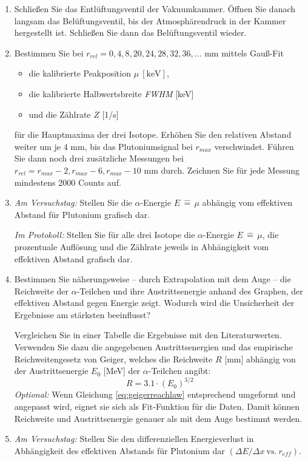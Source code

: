 \begin{enumerate}[label=\textbf{\alph*)}]
	\item Schließen Sie das Entlüftungsventil der Vakuumkammer. Öffnen Sie danach langsam das Belüftungsventil, bis der Atmosphärendruck in der Kammer hergestellt ist. Schließen Sie dann das Belüftungsventil wieder.
	\item Bestimmen Sie bei $r_{rel} = 0, 4, 8, 20, 24, 28, 32, 36, \dots$ mm mittels Gauß-Fit
	\begin{itemize}[nosep]
		\item die kalibrierte Peakposition $\mu\ [\text{keV}]$,
		\item die kalibrierte Halbwertsbreite \textit{FWHM} [keV]
		\item und die Zählrate $Z$ [1/s]
	\end{itemize}
	für die Hauptmaxima der drei Isotope. Erhöhen Sie den relativen Abstand weiter um je $4$ mm, bis das Plutoniumsignal bei $r_{max}$ verschwindet. Führen Sie dann noch drei zusätzliche Messungen bei $r_{rel} = r_{max} - 2, r_{max} - 6, r_{max} - 10$ mm durch. Zeichnen Sie für jede Messung mindestens 2000 Counts auf.
	\item \textit{Am Versuchstag:} Stellen Sie die $\alpha$-Energie $E\, \widehat{=}\, \mu$ abhängig vom effektiven Abstand für Plutonium grafisch dar.
	
	\textit{Im Protokoll:} Stellen Sie für alle drei Isotope die $\alpha$-Energie $E\, \widehat{=}\, \mu$, die prozentuale Auflösung und die Zählrate jeweils in Abhängigkeit vom effektiven Abstand grafisch dar.
	\item Bestimmen Sie näherungsweise -- durch Extrapolation mit dem Auge -- die Reichweite der $\alpha$-Teilchen und ihre Austrittsenergie anhand des Graphen, der effektiven Abstand gegen Energie zeigt. Wodurch wird die Unsicherheit der Ergebnisse am stärksten beeinflusst?
	
	Vergleichen Sie in einer Tabelle die Ergebnisse mit den Literaturwerten. Verwenden Sie dazu die angegebenen Austrittsenergien und das empirische Reichweitengesetz von Geiger, welches die Reichweite $R$ [mm] abhängig von der Austrittsenergie $E_0$ [MeV] der $\alpha$-Teilchen angibt:
	\begin{equation}\label{eq:geigerreachlaw}
		R = 3.1 \cdot \left(E_0\right)^{3/2}
	\end{equation}
	\textit{Optional:} Wenn Gleichung \ref{eq:geigerreachlaw} entsprechend umgeformt und angepasst wird, eignet sie sich als Fit-Funktion für die Daten. Damit können Reichweite und Austrittsenergie genauer als mit dem Auge bestimmt werden.
	\item \textit{Am Versuchstag:} Stellen Sie den differenziellen Energieverlust in Abhängigkeit des effektiven Abstands für Plutonium dar $\left( \Delta E/ \Delta x \ \text{vs.}\ r_{eff} \right)$.
	

\end{enumerate}
